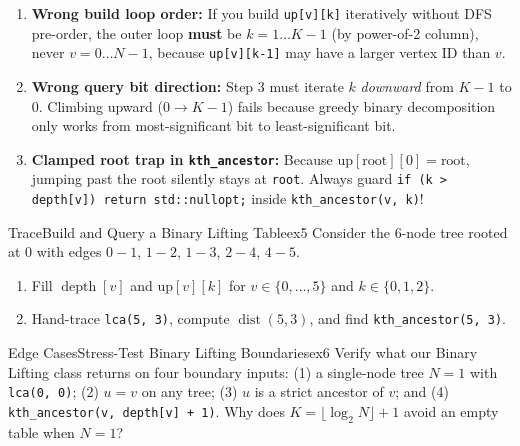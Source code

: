 \documentclass[11pt,a4paper]{article}
\theoremstyle{definition}
\begin{document}
\begin{watchoutbox}
\begin{enumerate}[itemsep=1pt, topsep=2pt]
    \item \textbf{Wrong build loop order:} If you build \texttt{up[v][k]} iteratively without DFS pre-order, the outer loop \textbf{must} be $k = 1 \dots K - 1$ (by power-of-2 column), never $v = 0 \dots N - 1$, because \texttt{up[v][k-1]} may have a larger vertex ID than $v$.
    \item \textbf{Wrong query bit direction:} Step 3 must iterate $k$ \emph{downward} from $K - 1$ to $0$. Climbing upward ($0 \to K - 1$) fails because greedy binary decomposition only works from most-significant bit to least-significant bit.
    \item \textbf{Clamped root trap in \texttt{kth\_ancestor}:} Because $\text{up}[\text{root}][0] = \text{root}$, jumping past the root silently stays at \texttt{root}. Always guard \texttt{if (k > depth[v]) return std::nullopt;} inside \texttt{kth\_ancestor(v, k)}!
\end{enumerate}
\end{watchoutbox}

\begin{tryitbox}{Trace}{Build and Query a Binary Lifting Table}{ex5}
Consider the 6-node tree rooted at $0$ with edges $0{-}1$, $1{-}2$, $1{-}3$, $2{-}4$, $4{-}5$.
\begin{enumerate}[itemsep=2pt, topsep=2pt]
    \item Fill $\operatorname{depth}[v]$ and $\text{up}[v][k]$ for $v \in \{0, \dots, 5\}$ and $k \in \{0, 1, 2\}$.
    \item Hand-trace \texttt{lca(5, 3)}, compute $\operatorname{dist}(5, 3)$, and find \texttt{kth\_ancestor(5, 3)}.
\end{enumerate}
\end{tryitbox}

\begin{tryitbox}{Edge Cases}{Stress-Test Binary Lifting Boundaries}{ex6}
Verify what our Binary Lifting class returns on four boundary inputs: (1) a single-node tree $N = 1$ with \texttt{lca(0, 0)}; (2) $u = v$ on any tree; (3) $u$ is a strict ancestor of $v$; and (4) \texttt{kth\_ancestor(v, depth[v] + 1)}. Why does $K = \lfloor \log_2 N \rfloor + 1$ avoid an empty table when $N = 1$?
\end{tryitbox}

\end{document}
